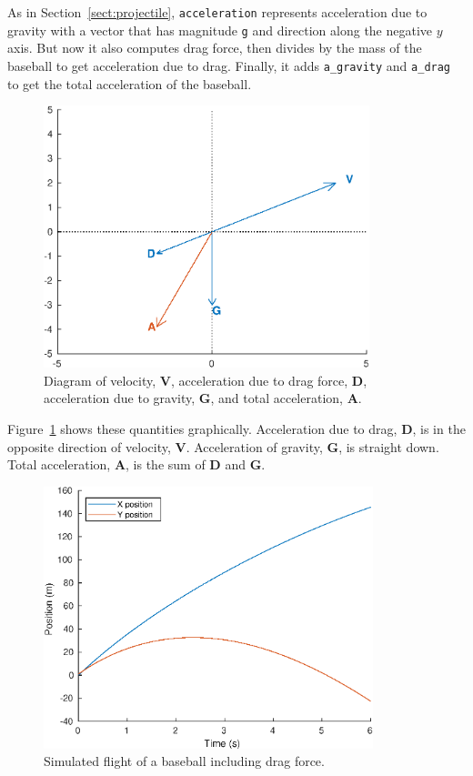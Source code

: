\documentclass[
]{book}
\numberwithin{Answer}{chapter}
\numberwithin{Exercise}{chapter}
\renewcommand{\vec}[1]{\bm{\mathbf{#1}}}
\begin{document}
As in Section~\ref{sect:projectile}, {\tt acceleration} represents acceleration due to gravity with a vector that has magnitude {\tt g} and direction along the negative $y$ axis.
But now it also computes drag force, then divides by the mass of the baseball to get acceleration due to drag.
Finally, it adds \verb"a_gravity" and \verb"a_drag" to get the total acceleration of the baseball.

\begin{figure}
\centerline{\includegraphics[height=3in]{figs/vector3.eps}}
\caption{Diagram of velocity, $\vec{V}$, acceleration due to drag force, 
$\vec{D}$, acceleration due to gravity, $\vec{G}$, and total acceleration, $\vec{A}$.}
\label{fig:vector3}
\end{figure}

Figure~\ref{fig:vector3} shows these quantities graphically.  Acceleration due to drag, $\vec{D}$, is in the opposite direction of velocity, $\vec{V}$.  Acceleration of gravity, $\vec{G}$, is straight down.  Total acceleration, $\vec{A}$, is the sum of $\vec{D}$ and $\vec{G}$.


\begin{figure}
\centerline{\includegraphics[height=3in]{figs/baseball2.eps}}
\caption{Simulated flight of a baseball including drag force.}
\label{fig:baseball2}
\end{figure}
\end{document}
